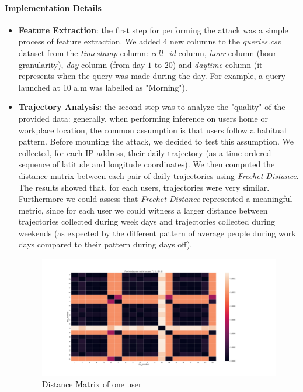 \documentclass[10pt,conference,compsocconf]{IEEEtran}
\begin{document}
\paragraph{Implementation Details}
\begin{itemize}
    \item \textbf{Feature Extraction}: the first step for performing the attack
    was a simple process of feature extraction. We added 4 new columns to the
    \textit{queries.csv} dataset from the \textit{timestamp} column:
    \textit{cell\_id} column, \textit{hour} column (hour granularity),
    \textit{day} column (from day $1$ to $20$) and \textit{daytime}
    column (it represents when the query was made during the day. For example, a query launched
    at 10 a.m was labelled as "Morning").
    \item \textbf{Trajectory Analysis}: the second step was to
    analyze the "quality" of the provided data: generally, when performing
    inference on users home or workplace location, the common assumption is that
    users follow a habitual pattern. Before
    mounting the attack, we decided to test this assumption. We collected, for
    each IP address, their daily trajectory (as a time-ordered sequence of
    latitude and longitude coordinates). We then computed the distance matrix
    between each pair of daily trajectories using \textit{Frechet Distance}. The
    results showed that, for each users, trajectories were very similar.
    Furthermore we could assess that \textit{Frechet Distance} represented a
    meaningful metric, since for each user we could witness a larger distance
    between trajectories collected during week days and trajectories collected
    during weekends (as expected by the different pattern of average people
    during work days compared to their pattern during days off).


    \begin{figure}[h!]
        \centering
        \includegraphics[width=0.5\linewidth]{../privacy_evaluation/daily_trajectories/7.210.121.52-matrix.png}
        \caption{Distance Matrix of one user}
        \label{fig:matrix}
    \end{figure}



\end{itemize}
\end{document}
